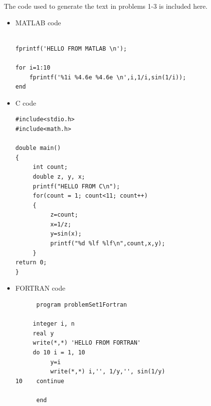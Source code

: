 \eenum
\pagebreak
The code used to generate the text in problems 1-3 is included here.
\begin{itemize}
\item MATLAB code
\begin{lstlisting}

fprintf('HELLO FROM MATLAB \n');

for i=1:10
    fprintf('%1i %4.6e %4.6e \n',i,1/i,sin(1/i));
end
\end{lstlisting}

\item C code
\begin{lstlisting}
#include<stdio.h>
#include<math.h>

double main()
{
     int count;
     double z, y, x;
     printf("HELLO FROM C\n");
     for(count = 1; count<11; count++)
     {
          z=count;
          x=1/z;
          y=sin(x);
          printf("%d %lf %lf\n",count,x,y);
     }
return 0;
}
\end{lstlisting}

\item FORTRAN code
\begin{lstlisting}
      program problemSet1Fortran
	 
	 integer i, n
	 real y
	 write(*,*) 'HELLO FROM FORTRAN'
	 do 10 i = 1, 10
          y=i
          write(*,*) i,'', 1/y,'', sin(1/y)
10    continue

      end
\end{lstlisting}
\end{itemize}
